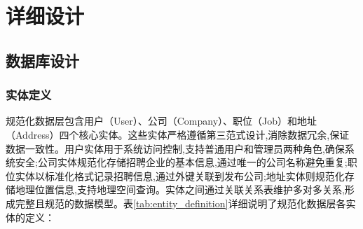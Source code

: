 \section{详细设计}
\subsection{数据库设计}

\subsubsection{实体定义}
规范化数据层包含用户（User）、公司（Company）、职位（Job）和地址（Address）四个核心实体。这些实体严格遵循第三范式设计,消除数据冗余,保证数据一致性。用户实体用于系统访问控制,支持普通用户和管理员两种角色,确保系统安全;公司实体规范化存储招聘企业的基本信息,通过唯一的公司名称避免重复;职位实体以标准化格式记录招聘信息,通过外键关联到发布公司;地址实体则规范化存储地理位置信息,支持地理空间查询。实体之间通过关联关系表维护多对多关系,形成完整且规范的数据模型。表\ref{tab:entity_definition}详细说明了规范化数据层各实体的定义：

